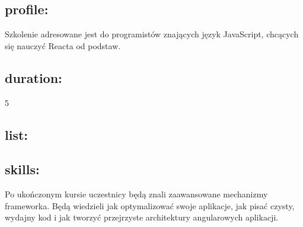 \documentclass{article}[10pt]
\begin{document}
	\subsection*{profile:}
\begin{adjustwidth}{2cm}{}
	
Szkolenie adresowane jest do programistów znających język JavaScript, chcących się nauczyć Reacta od podstaw.
\end{adjustwidth}
	\subsection*{duration:}
\begin{adjustwidth}{2cm}{}
	5
\end{adjustwidth}

	\subsection*{list:}
\begin{adjustwidth}{1.5cm}{}
	\begin{itemize}













































	\end{itemize}
\end{adjustwidth}

	\subsection*{skills:}
\begin{adjustwidth}{2cm}{}
	
Po ukończonym kursie uczestnicy będą znali zaawansowane mechanizmy frameworka. Będą wiedzieli jak optymalizować swoje aplikacje, jak pisać czysty, wydajny kod i jak tworzyć przejrzyste architektury angularowych aplikacji.



\end{adjustwidth}
\end{document}
